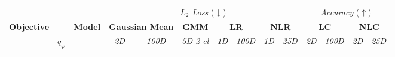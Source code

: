 {
\begin{table*}[t]
    \color{red}
    \centering
\footnotesize	    {}
    \setlength{\tabcolsep}{0pt}
    \begin{tabular}{lcr cc c cc cc cc cc}
        \toprule
         &  &  & \multicolumn{7}{c}{\textit{$L_2$ Loss} ($\downarrow$)} & \multicolumn{4}{c}{\textit{Accuracy} ($\uparrow$)}\\
         \cmidrule(lr){4-10}\cmidrule(lr){11-14}
        \textbf{Objective} & & \textbf{Model} & \multicolumn{2}{c}{\textbf{Gaussian Mean}} & \multicolumn{1}{c}{\textbf{GMM}} & \multicolumn{2}{c}{\textbf{LR}} & \multicolumn{2}{c}{\textbf{NLR}} & \multicolumn{2}{c}{\textbf{LC}} & \multicolumn{2}{c}{\textbf{NLC}} \\
        \cmidrule(lr){4-5}\cmidrule(lr){6-6}\cmidrule(lr){7-8}\cmidrule(lr){9-10}\cmidrule(lr){11-12}\cmidrule(lr){13-14}
        & $q_\varphi$ & & \textit{2D} & \textit{100D} & \textit{5D 2 cl} & \textit{1D} & \textit{100D} & \textit{1D} & \textit{25D} & \textit{2D} & \textit{100D} &  \textit{2D} & \textit{25D}\\
        \midrule


\end{tabular}
\end{table*}}
